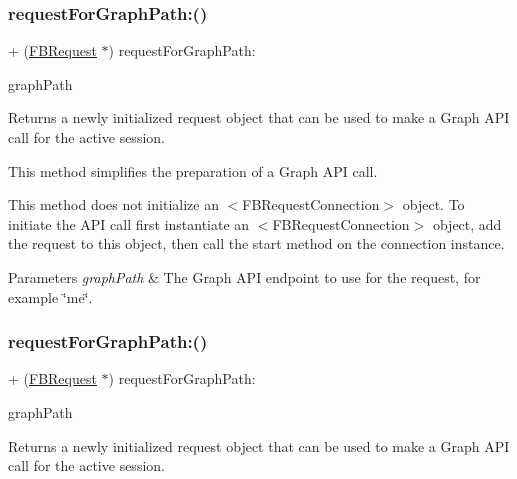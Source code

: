 \subsubsection{\texorpdfstring{request\+For\+Graph\+Path\+:()}{requestForGraphPath:()}\hspace{0.1cm}{\footnotesize\ttfamily [3/5]}}
{\footnotesize\ttfamily + (\hyperlink{interfaceFBRequest}{F\+B\+Request} $\ast$) request\+For\+Graph\+Path\+: \begin{DoxyParamCaption}\item[{(N\+S\+String $\ast$)}]{graph\+Path }\end{DoxyParamCaption}}

Returns a newly initialized request object that can be used to make a Graph A\+PI call for the active session.

This method simplifies the preparation of a Graph A\+PI call.

This method does not initialize an $<$\+F\+B\+Request\+Connection$>$ object. To initiate the A\+PI call first instantiate an $<$\+F\+B\+Request\+Connection$>$ object, add the request to this object, then call the {\ttfamily start} method on the connection instance.


\begin{DoxyParams}{Parameters}
{\em graph\+Path} & The Graph A\+PI endpoint to use for the request, for example \char`\"{}me\char`\"{}. \\
\hline
\end{DoxyParams}
\mbox{\label{interfaceFBRequest_a33356f35896b2f50d96ed24c8ddf5841}} 
\subsubsection{\texorpdfstring{request\+For\+Graph\+Path\+:()}{requestForGraphPath:()}\hspace{0.1cm}{\footnotesize\ttfamily [4/5]}}
{\footnotesize\ttfamily + (\hyperlink{interfaceFBRequest}{F\+B\+Request} $\ast$) request\+For\+Graph\+Path\+: \begin{DoxyParamCaption}\item[{(N\+S\+String $\ast$)}]{graph\+Path }\end{DoxyParamCaption}}

Returns a newly initialized request object that can be used to make a Graph A\+PI call for the active session.

